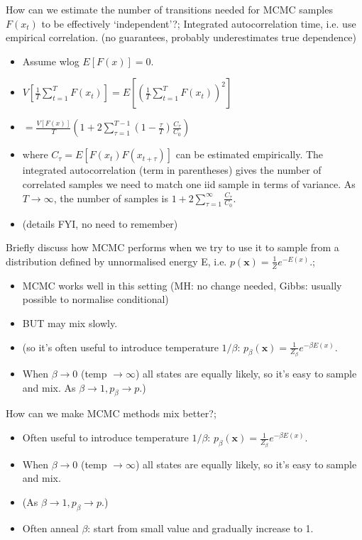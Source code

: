 \documentclass{article}
\begin{document}
How can we estimate the number of transitions needed for MCMC samples $F(x_t)$ to be effectively `independent'?; Integrated autocorrelation time, i.e. use empirical correlation. (no guarantees, probably underestimates true dependence) \begin{itemize}
    \item Assume wlog $E[F(x)] = 0$.
    \item $V[\frac{1}{T}\sum_{t=1}^T F(x_t)] = E[(\frac{1}{T}\sum_{t=1}^TF(x_t))^2]$
    \item $=\frac{V[F(x)]}{T}(1+2\sum_{\tau = 1}^{T-1}(1-\frac{\tau}{T})\frac{C_\tau}{C_0})$
    \item where $C_\tau = E[F(x_t)F(x_{t+\tau})]$ can be estimated empirically. The integrated autocorrelation (term in parentheses) gives the number of correlated samples we need to match one iid sample in terms of variance.
    As $T\rightarrow\infty$, the number of samples is $1+2\sum_{\tau=1}^\infty \frac{C_\tau}{C_0}$.
    \item (details FYI, no need to remember)
\end{itemize}

Briefly discuss how MCMC performs when we try to use it to sample from a distribution defined by unnormalised energy E, i.e. $p(\mathbf{x}) = \frac{1}{Z}e^{-E(x)}$.; \begin{itemize}
    \item MCMC works well in this setting (MH: no change needed, Gibbs: usually possible to normalise conditional)
    \item BUT may mix slowly.
    \item (so it's often useful to introduce temperature $1/\beta$: $p_\beta(\mathbf{x}) = \frac{1}{Z_{\beta}}e^{-\beta E(x)}$.
    \item When $\beta\rightarrow 0$ (temp $\rightarrow\infty$) all states are equally likely, so it's easy to sample and mix. As $\beta\rightarrow1, p_\beta\rightarrow p$.)
\end{itemize}

How can we make MCMC methods mix better?; \begin{itemize}
    \item Often useful to introduce temperature $1/\beta$: $p_\beta(\mathbf{x}) = \frac{1}{Z_{\beta}}e^{-\beta E(x)}$.
    \item When $\beta\rightarrow 0$ (temp $\rightarrow\infty$) all states are equally likely, so it's easy to sample and mix. 
    \item (As $\beta\rightarrow1, p_\beta\rightarrow p$.)
    \item Often anneal $\beta$: start from small value and gradually increase to 1.
\end{itemize}
\end{document}
